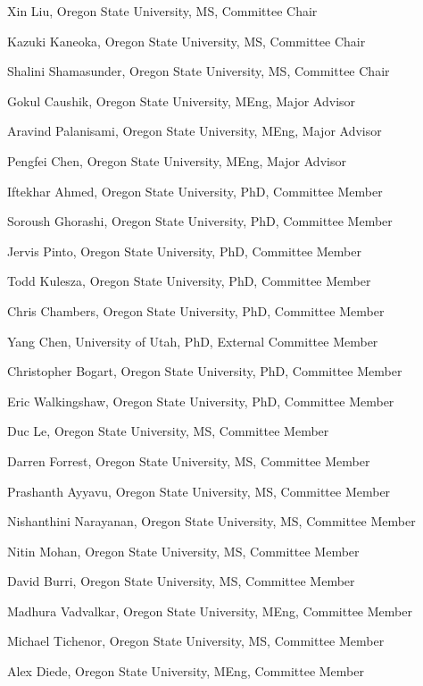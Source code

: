 \documentclass[ComputerScience]{vita}
\begin{document}
\begin{vita}
\begin{Other Graduated Students}
\item Xin Liu, Oregon State University, MS, Committee Chair 
\item Kazuki Kaneoka, Oregon State University, MS, Committee Chair 
\item Shalini Shamasunder, Oregon State University, MS, Committee Chair
\item Gokul Caushik, Oregon State University, MEng, Major Advisor
\item Aravind Palanisami, Oregon State University, MEng, Major Advisor
\item Pengfei Chen, Oregon State University, MEng, Major Advisor
\item Iftekhar Ahmed, Oregon State University, PhD, Committee Member
\item Soroush Ghorashi, Oregon State University, PhD, Committee Member
\item Jervis Pinto, Oregon State University, PhD, Committee Member
\item Todd Kulesza, Oregon State University, PhD, Committee Member
\item Chris Chambers, Oregon State University, PhD, Committee Member
\item Yang Chen, University of Utah, PhD, External Committee Member
\item Christopher Bogart, Oregon State University, PhD, Committee Member
\item Eric Walkingshaw, Oregon State University, PhD, Committee Member
\item Duc Le, Oregon State University, MS, Committee Member
\item Darren Forrest, Oregon State University, MS, Committee Member
\item Prashanth Ayyavu, Oregon State University, MS, Committee Member
\item Nishanthini Narayanan, Oregon State University, MS, Committee Member
\item Nitin Mohan, Oregon State University, MS, Committee Member
\item David Burri, Oregon State University, MS, Committee Member
\item Madhura Vadvalkar, Oregon State University, MEng, Committee Member
\item Michael Tichenor, Oregon State University, MS, Committee Member
\item Alex Diede, Oregon State University, MEng, Committee Member
\end{Other Graduated Students}




\end{vita}
\end{document}

